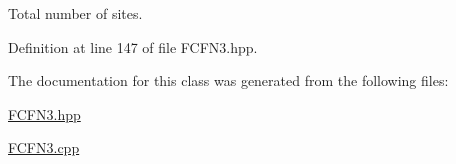 \-Total number of sites. 



\-Definition at line 147 of file \-F\-C\-F\-N3.\-hpp.



\-The documentation for this class was generated from the following files\-:\begin{DoxyCompactItemize}
\item 
\hyperlink{FCFN3_8hpp}{\-F\-C\-F\-N3.\-hpp}\item 
\hyperlink{FCFN3_8cpp}{\-F\-C\-F\-N3.\-cpp}\end{DoxyCompactItemize}
